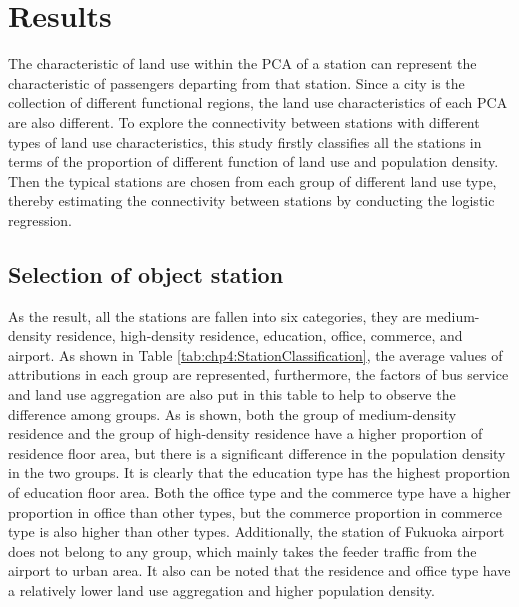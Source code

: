 \section{Results}
%
The characteristic of land use within the PCA of a station can represent the characteristic of passengers departing from that station. Since a city is the collection of different functional regions, the land use characteristics of each PCA are also different. To explore the connectivity between stations with different types of land use characteristics, this study firstly classifies all the stations in terms of the proportion of different function of land use and population density. Then the typical stations are chosen from each group of different land use type, thereby estimating the connectivity between stations by conducting the logistic regression. 

\subsection{Selection of object station}
%
As the result, all the stations are fallen into six categories, they are medium-density residence, high-density residence, education, office, commerce, and airport. As shown in Table \ref{tab:chp4:StationClassification}, the average values of attributions in each group are represented, furthermore, the factors of bus service and land use aggregation are also put in this table to help to observe the difference among groups. As is shown, both the group of medium-density residence and the group of high-density residence have a higher proportion of residence floor area, but there is a significant difference in the population density in the two groups. It is clearly that the education type has the highest proportion of education floor area. Both the office type and the commerce type have a higher proportion in office than other types, but the commerce proportion in commerce type is also higher than other types. Additionally, the station of Fukuoka airport does not belong to any group, which mainly takes the feeder traffic from the airport to urban area. It also can be noted that the residence and office type have a relatively lower land use aggregation and higher population density.

